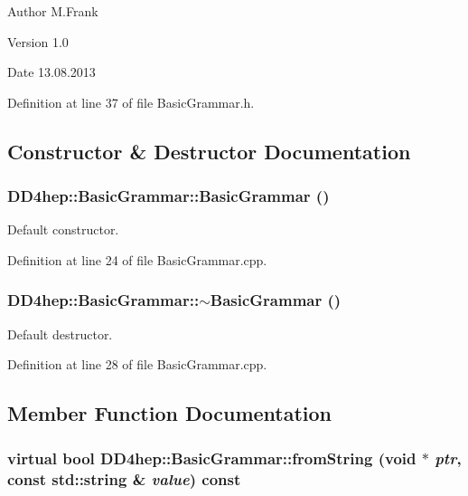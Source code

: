 \begin{DoxyAuthor}{Author}
M.Frank 
\end{DoxyAuthor}
\begin{DoxyVersion}{Version}
1.0 
\end{DoxyVersion}
\begin{DoxyDate}{Date}
13.08.2013 
\end{DoxyDate}


Definition at line 37 of file BasicGrammar.h.

\subsection{Constructor \& Destructor Documentation}
\hypertarget{class_d_d4hep_1_1_basic_grammar_adda1bb3c1b1167a1f81688092a40f02a}{
\subsubsection[{BasicGrammar}]{\setlength{\rightskip}{0pt plus 5cm}DD4hep::BasicGrammar::BasicGrammar ()}}
\label{class_d_d4hep_1_1_basic_grammar_adda1bb3c1b1167a1f81688092a40f02a}


Default constructor. 

Definition at line 24 of file BasicGrammar.cpp.\hypertarget{class_d_d4hep_1_1_basic_grammar_a9110ad3238c79f23fb42cdf69d3322b9}{
\subsubsection[{$\sim$BasicGrammar}]{\setlength{\rightskip}{0pt plus 5cm}DD4hep::BasicGrammar::$\sim$BasicGrammar ()}}
\label{class_d_d4hep_1_1_basic_grammar_a9110ad3238c79f23fb42cdf69d3322b9}


Default destructor. 

Definition at line 28 of file BasicGrammar.cpp.

\subsection{Member Function Documentation}
\hypertarget{class_d_d4hep_1_1_basic_grammar_adf08fd5e01cf623c8b0e239bbe0b1868}{
\subsubsection[{fromString}]{\setlength{\rightskip}{0pt plus 5cm}virtual bool DD4hep::BasicGrammar::fromString (void $\ast$ {\em ptr}, \/  const std::string \& {\em value}) const}}
\label{class_d_d4hep_1_1_basic_grammar_adf08fd5e01cf623c8b0e239bbe0b1868}



